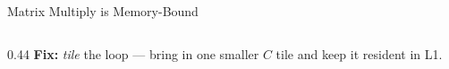 \documentclass[aspectratio=169]{beamer}
\begin{document}
\begin{frame}{Matrix Multiply is Memory-Bound}
\begin{columns}[c]
\begin{column}{0.44\textwidth}
      \bigskip
      \textbf{Fix:} \emph{tile} the loop --- bring in one smaller $C$ tile and keep it resident in L1.
    \end{column}

  \end{columns}
\end{frame}

%
\end{document}
